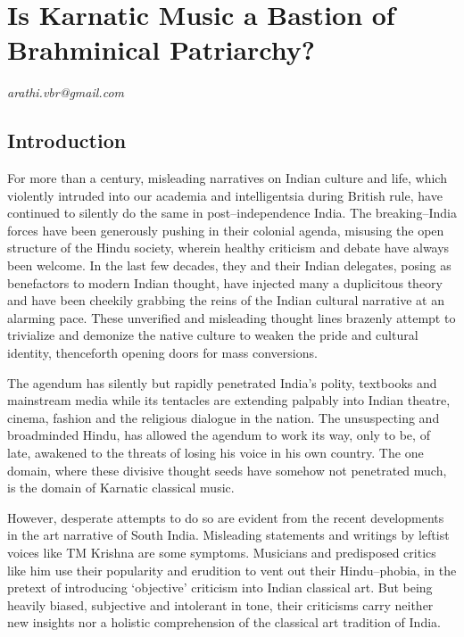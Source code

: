 
\chapter{Is Karnatic Music a Bastion of Brahminical Patriarchy?}\label{chapter7}


\begin{flushright}
\textit{arathi.vbr@gmail.com}
\end{flushright}


\section*{Introduction}

For more than a century, misleading narratives on Indian culture and life, which violently intruded into our academia and intelligentsia during British rule, have continued to silently do the same in post–independence India. The breaking–India forces have been generously pushing in their colonial agenda, misusing the open structure of the Hindu society, wherein healthy criticism and debate have always been welcome. In the last few decades, they and their Indian delegates, posing as benefactors to modern Indian thought, have injected many a duplicitous theory and have been cheekily grabbing the reins of the Indian cultural narrative at an alarming pace. These unverified and misleading thought lines brazenly attempt to trivialize and demonize the native culture to weaken the pride and cultural identity, thenceforth opening doors for mass conversions.

The agendum has silently but rapidly penetrated India’s polity, textbooks and mainstream media while its tentacles are extending palpably into Indian theatre, cinema, fashion and the religious dialogue in the nation. The unsuspecting and broadminded Hindu, has allowed the agendum to work its way, only to be, of late, awakened to the threats of losing his voice in his own country. The one domain, where these divisive thought seeds have somehow not penetrated much, is the domain of Karnatic classical music.

However, desperate attempts to do so are evident from the recent developments in the art narrative of South India. Misleading statements and writings by leftist voices like TM Krishna are some symptoms. Musicians and predisposed critics like him use their popularity and erudition to vent out their Hindu–phobia, in the pretext of introducing ‘objective’ criticism into Indian classical art. But being heavily biased, subjective and intolerant in tone, their criticisms carry neither new insights nor a holistic comprehension of the classical art tradition of India.


